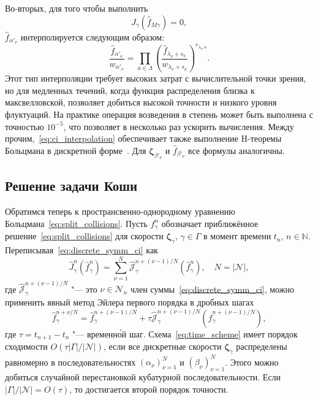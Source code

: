 \documentclass[
aps,%
12pt,%
final,%
notitlepage,%
oneside,%
onecolumn,%
nobibnotes,%
nofootinbib,%
superscriptaddress,%
noshowpacs,%
showkeys,%
floatfix,%
tightenlines,%
centertags]%
{revtex4}
\newcommand{\bzeta}{\boldsymbol{\zeta}}
\newcommand{\Nu}{\mathcal{N}}
\newcommand{\OO}[1]{O(#1)}
\begin{document}
Во-вторых, для того чтобы выполнить
\begin{equation}\label{eq:strict_interpolation}
    J_\gamma\left(\hat{f}_{M\gamma}\right) = 0,
\end{equation}
\(\hat{f}_{\alpha'_\nu}\) интерполируется следующим образом:
\begin{equation}\label{eq:ci_interpolation}
    \frac{\hat{f}_{\alpha'_\nu}}{w_{\alpha'_\nu}} = \prod_{a\in\Lambda}
        \left(\frac{\hat{f}_{\lambda_\nu+s_a}}{w_{\lambda_\nu+s_a}} \right)^{r_{\lambda_\nu,a}}.
\end{equation}
Этот тип интерполяции требует высоких затрат с вычислительной точки зрения,
но для медленных течений, когда функция распределения близка к максвелловской,
позволяет добиться высокой точности и низкого уровня флуктуаций.
На практике операция возведения в степень может быть выполнена с точностью \(10^{-5}\),
что позволяет в несколько раз ускорить вычисления.
Между прочим,~\eqref{eq:ci_interpolation} обеспечивает также
выполнение H-теоремы Больцмана в дискретной форме~\citep{Dodulad2013}.
Для \(\bzeta_{\beta'_\nu}\) и \(\hat{f}_{\beta'_\nu}\) все формулы аналогичны.

\subsection{Решение задачи Коши}

Обратимся теперь к пространсвенно-однородному уравнению Больцмана~\eqref{eq:split_collisions}.
Пусть \(f_\gamma^n\) обозначает приближённое решение~\eqref{eq:split_collisions}
для скорости \(\bzeta_\gamma\), \(\gamma\in\Gamma\) в момент времени \(t_n\), \(n\in\mathbb{N}\).
Переписывая~\eqref{eq:discrete_symm_ci} как
\begin{equation}\label{eq:discrete_short_ci}
    \hat{J}_\gamma^n\left(\hat{f}_\gamma^n\right) =
        \sum_{\nu=1}^N \hat{\mathscr{J}}_\gamma^{n+(\nu-1)/N} \left(\hat{f}_\gamma^n\right), \quad
    N=|\Nu|,
\end{equation}
где \(\hat{\mathscr{J}}_\gamma^{n+(\nu-1)/N}\) "--- это \(\nu\in\Nu_n\) член суммы~\eqref{eq:discrete_symm_ci},
можно применить явный метод Эйлера первого порядка в дробных шагах
\begin{equation}\label{eq:time_scheme}
    \hat{f}_\gamma^{n+\nu/N} = \hat{f}_\gamma^{n+(\nu-1)/N} + \tau \hat{\mathscr{J}}_\gamma^{n+(\nu-1)/N}
    \left(\hat{f}_\gamma^{n+(\nu-1)/N}\right),
\end{equation}
где \(\tau = t_{n+1} - t_n\) "--- временн\'{о}й шаг.
Схема~\eqref{eq:time_scheme} имеет порядок сходимости \(\OO{\tau|\Gamma|/|\Nu|}\),
если все дискретные скорости \(\bzeta_\gamma\) распределены равномерно
в последовательностях \((\alpha_\nu)_{\nu=1}^N\) и \((\beta_\nu)_{\nu=1}^N\).
Этого можно добиться случайной перестановкой кубатурной последовательности.
Если \(|\Gamma|/|\Nu| = \OO{\tau}\), то достигается второй порядок точности.
\end{document}
